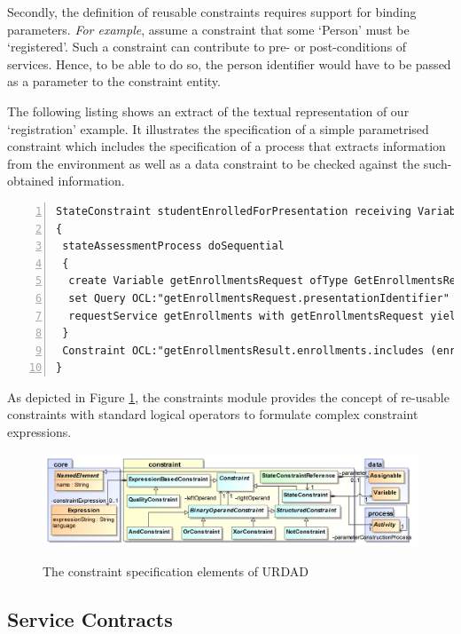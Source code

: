 Secondly, the definition of reusable constraints requires support for binding parameters. \emph{For example}, assume a constraint that some `Person' must be `registered'. Such a constraint can contribute to pre- or post-conditions of services. Hence, to be able to do so, the person identifier would have to be passed as a parameter to the constraint entity. 

The following listing shows an extract of the textual representation of our `registration' example. It illustrates the specification of a simple parametrised constraint which includes the specification of a process that extracts information from the environment as well as a data constraint to be checked against the such-obtained information.
\lstset{language=urdad,caption=Specifying a state constraint in the textual URDAD DSL syntax.,label=constraintTextSyntax}
\begin{lstlisting}[numbers=left,escapechar=|]
StateConstraint studentEnrolledForPresentation receiving Variable enrollForPresentationRequest ofType EnrollForPresentationRequest
{
 stateAssessmentProcess doSequential
 {
  create Variable getEnrollmentsRequest ofType GetEnrollmentsRequest
  set Query OCL:"getEnrollmentsRequest.presentationIdentifier" equalTo Query OCL:"enrollForPresentationRequest.presentationIdentifier"
  requestService getEnrollments with getEnrollmentsRequest yielding Variable getEnrollmentsResult ofType GetEnrollmentsResult
 }
 Constraint OCL:"getEnrollmentsResult.enrollments.includes (enrollForPresentationRequest.personIdentifier)"
}
\end{lstlisting}

As depicted in Figure \ref{fig:constraintModule}, the constraints module provides the concept of re-usable constraints with standard logical operators to formulate complex constraint expressions.
\begin{figure}[tb!]
  \centering
  \includegraphics{constraint}\\   
  \caption{The constraint specification elements of URDAD}
  \label{fig:constraintModule}
\end{figure}

\subsection{Service Contracts}

